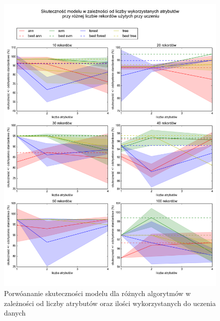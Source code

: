 \begin{figure}[ht!]
\centering
\includegraphics[scale=0.45]{res/extractionSummary.png}
\caption[Caption for LOF]{Porwóananie skuteczności modelu dla różnych algorytmów w zależności od liczby atrybutów oraz ilości wykorzystanych do uczenia danych\label{extractionSummary}}
\end{figure} 


